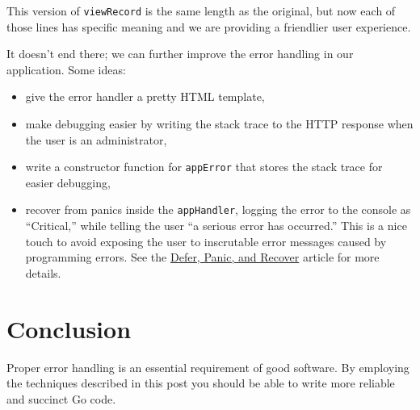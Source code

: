 This version of \texttt{viewRecord} is the same length as the original,
but now each of those lines has specific meaning and we are providing a
friendlier user experience.

It doesn't end there; we can further improve the error handling in our
application. Some ideas:

\begin{itemize}
\item
  give the error handler a pretty HTML template,
\item
  make debugging easier by writing the stack trace to the HTTP response
  when the user is an administrator,
\item
  write a constructor function for \texttt{appError} that stores the
  stack trace for easier debugging,
\item
  recover from panics inside the \texttt{appHandler}, logging the error
  to the console as ``Critical,'' while telling the user ``a serious
  error has occurred.'' This is a nice touch to avoid exposing the user
  to inscrutable error messages caused by programming errors. See the
  \href{defer\_panic\_recover.html}{Defer, Panic, and Recover} article
  for more details.
\end{itemize}

\section*{Conclusion}

Proper error handling is an essential requirement of good software. By
employing the techniques described in this post you should be able to
write more reliable and succinct Go code.
